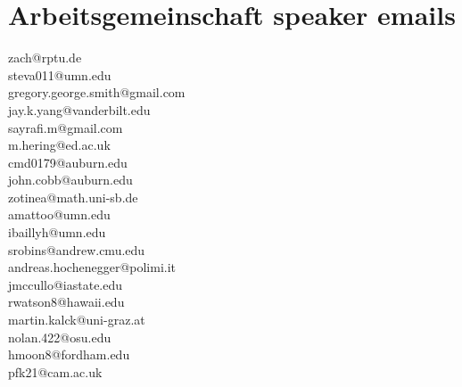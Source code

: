\documentclass[11pt]{article}
\begin{document}
\section*{Arbeitsgemeinschaft speaker emails}

\begin{flushleft}
\ttfamily
zach@rptu.de\\
steva011@umn.edu\\
gregory.george.smith@gmail.com\\
jay.k.yang@vanderbilt.edu\\
sayrafi.m@gmail.com\\
m.hering@ed.ac.uk\\
cmd0179@auburn.edu\\
john.cobb@auburn.edu\\
zotinea@math.uni-sb.de\\
amattoo@umn.edu\\
ibaillyh@umn.edu\\
srobins@andrew.cmu.edu\\
andreas.hochenegger@polimi.it\\
jmccullo@iastate.edu\\
rwatson8@hawaii.edu\\
martin.kalck@uni-graz.at\\
nolan.422@osu.edu\\
hmoon8@fordham.edu\\
pfk21@cam.ac.uk
\end{flushleft}
\end{document}
